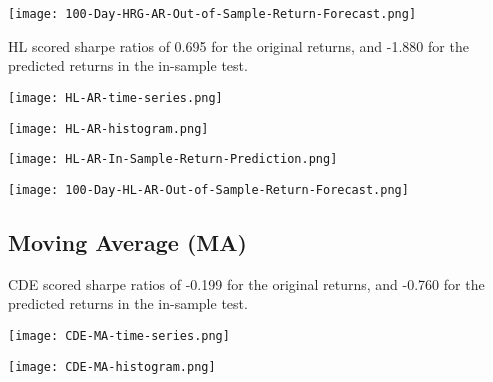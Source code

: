\begin{center}
    \texttt{[image: 100-Day-HRG-AR-Out-of-Sample-Return-Forecast.png]}
    \label{fig:nonfloat}
\end{center}

HL scored sharpe ratios of 0.695 for the original returns, and -1.880 for the predicted returns in the in-sample test.

\begin{center}  
    \texttt{[image: HL-AR-time-series.png]}
    \label{fig:nonfloat}
\end{center}

\begin{center}
    \texttt{[image: HL-AR-histogram.png]}
    \label{fig:nonfloat}
\end{center}

\begin{center}
    \texttt{[image: HL-AR-In-Sample-Return-Prediction.png]}
    \label{fig:nonfloat}
\end{center}

\begin{center}
    \texttt{[image: 100-Day-HL-AR-Out-of-Sample-Return-Forecast.png]}
    \label{fig:nonfloat}
\end{center}

\subsection{Moving Average (MA)}

CDE scored sharpe ratios of -0.199 for the original returns, and -0.760 for the predicted returns in the in-sample test.

\begin{center}
    \texttt{[image: CDE-MA-time-series.png]}
    \label{fig:nonfloat}
\end{center}

\begin{center}  
    \texttt{[image: CDE-MA-histogram.png]}
    \label{fig:nonfloat}
\end{center}

